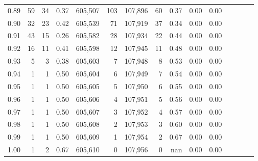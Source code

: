 \begin{tabular}{rrrcrrrrrrrrrrr}
0.89 &      59 &     34 &                                       0.37 &  605,507 &      103 &  107,896 &       60 &  0.37 &  0.00 &                         0.00 \\
0.90 &      32 &     23 &                                       0.42 &  605,539 &       71 &  107,919 &       37 &  0.34 &  0.00 &                         0.00 \\
0.91 &      43 &     15 &                                       0.26 &  605,582 &       28 &  107,934 &       22 &  0.44 &  0.00 &                         0.00 \\
0.92 &      16 &     11 &                                       0.41 &  605,598 &       12 &  107,945 &       11 &  0.48 &  0.00 &                         0.00 \\
0.93 &       5 &      3 &                                       0.38 &  605,603 &        7 &  107,948 &        8 &  0.53 &  0.00 &                         0.00 \\
0.94 &       1 &      1 &                                       0.50 &  605,604 &        6 &  107,949 &        7 &  0.54 &  0.00 &                         0.00 \\
0.95 &       1 &      1 &                                       0.50 &  605,605 &        5 &  107,950 &        6 &  0.55 &  0.00 &                         0.00 \\
0.96 &       1 &      1 &                                       0.50 &  605,606 &        4 &  107,951 &        5 &  0.56 &  0.00 &                         0.00 \\
0.97 &       1 &      1 &                                       0.50 &  605,607 &        3 &  107,952 &        4 &  0.57 &  0.00 &                         0.00 \\
0.98 &       1 &      1 &                                       0.50 &  605,608 &        2 &  107,953 &        3 &  0.60 &  0.00 &                         0.00 \\
0.99 &       1 &      1 &                                       0.50 &  605,609 &        1 &  107,954 &        2 &  0.67 &  0.00 &                         0.00 \\
1.00 &       1 &      2 &                                       0.67 &  605,610 &        0 &  107,956 &        0 &   nan &  0.00 &                         0.00 \\
\bottomrule
\end{tabular}
